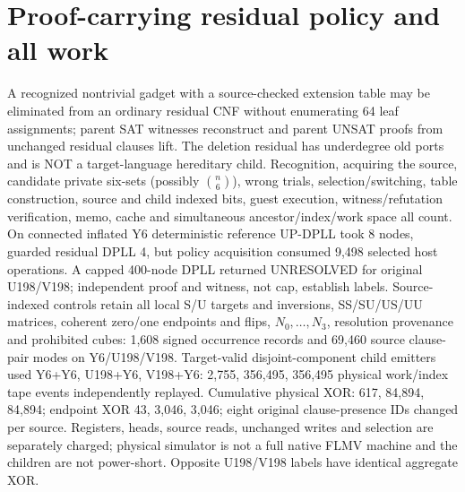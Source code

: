 \documentclass[11pt]{article}
\begin{document}
\section{Proof-carrying residual policy and all work}
A recognized nontrivial gadget with a source-checked extension table may be eliminated from an ordinary residual CNF without enumerating 64 leaf assignments; parent SAT witnesses reconstruct and parent UNSAT proofs from unchanged residual clauses lift. The deletion residual has underdegree old ports and is NOT a target-language hereditary child. Recognition, acquiring the source, candidate private six-sets (possibly $\binom n6$), wrong trials, selection/switching, table construction, source and child indexed bits, guest execution, witness/refutation verification, memo, cache and simultaneous ancestor/index/work space all count. On connected inflated Y6 deterministic reference UP-DPLL took 8 nodes, guarded residual DPLL 4, but policy acquisition consumed 9,498 selected host operations. A capped 400-node DPLL returned UNRESOLVED for original U198/V198; independent proof and witness, not cap, establish labels.
Source-indexed controls retain all local S/U targets and inversions, SS/SU/US/UU matrices, coherent zero/one endpoints and flips, $N_0,\ldots,N_3$, resolution provenance and prohibited cubes: 1,608 signed occurrence records and 69,460 source clause-pair modes on Y6/U198/V198. Target-valid disjoint-component child emitters used Y6+Y6, U198+Y6, V198+Y6: 2,755, 356,495, 356,495 physical work/index tape events independently replayed. Cumulative physical XOR: 617, 84,894, 84,894; endpoint XOR 43, 3,046, 3,046; eight original clause-presence IDs changed per source. Registers, heads, source reads, unchanged writes and selection are separately charged; physical simulator is not a full native FLMV machine and the children are not power-short. Opposite U198/V198 labels have identical aggregate XOR.
\end{document}
